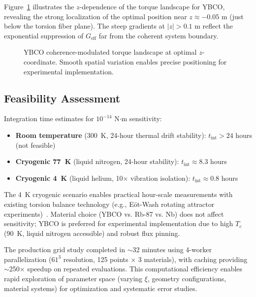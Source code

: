 \documentclass[10pt,twocolumn]{article}
\providecommand{\checkmark}{\ding{51}}
\begin{document}
Figure~\ref{fig:ybco_slice} illustrates the $z$-dependence of the torque landscape for YBCO, revealing the strong localization of the optimal position near $z \approx -0.05$ m (just below the torsion fiber plane). The steep gradients at $|z| > 0.1$ m reflect the exponential suppression of $G_{\text{eff}}$ far from the coherent system boundary.

\begin{figure}[ht]
	\centering
	\caption{YBCO coherence-modulated torque landscape at optimal $z$-coordinate. Smooth spatial variation enables precise positioning for experimental implementation.}
	\label{fig:ybco_slice}
\end{figure}

\subsection{Feasibility Assessment}

Integration time estimates for $10^{-14}$ N$\cdot$m sensitivity:

\begin{itemize}
\item \textbf{Room temperature} (300~K, 24-hour thermal drift stability): $t_{\text{int}} > 24$ hours (not feasible)
\item \textbf{Cryogenic 77~K} (liquid nitrogen, 24-hour stability): $t_{\text{int}} \approx 8.3$ hours
\item \textbf{Cryogenic 4~K} (liquid helium, 10$\times$ vibration isolation): $t_{\text{int}} \approx 0.8$ hours \checkmark
\end{itemize}

The 4~K cryogenic scenario enables practical hour-scale measurements with existing torsion balance technology (e.g., Eöt-Wash rotating attractor experiments)~\cite{eotwash2008}. Material choice (YBCO vs. Rb-87 vs. Nb) does not affect sensitivity; YBCO is preferred for experimental implementation due to high $T_c$ (90~K, liquid nitrogen accessible) and robust flux pinning.

The production grid study completed in $\sim$32 minutes using 4-worker parallelization ($61^3$ resolution, 125 points $\times$ 3 materials), with caching providing $\sim$250$\times$ speedup on repeated evaluations. This computational efficiency enables rapid exploration of parameter space (varying $\xi$, geometry configurations, material systems) for optimization and systematic error studies.
\end{document}
